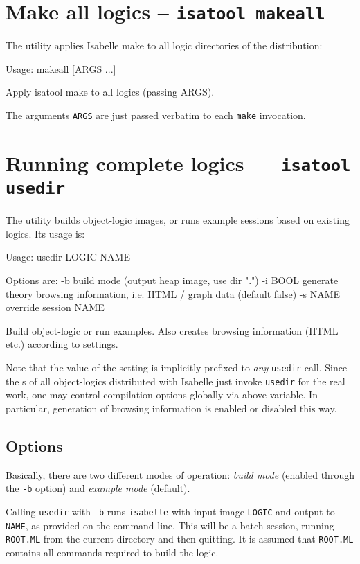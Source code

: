 \section{Make all logics -- \texttt{isatool makeall}}

The  utility applies Isabelle make to all logic
directories of the distribution:
\begin{ttbox}
Usage: makeall [ARGS ...]

  Apply isatool make to all logics (passing ARGS).
\end{ttbox}
The arguments \texttt{ARGS} are just passed verbatim to each
\texttt{make} invocation.


\section{Running complete logics --- \texttt{isatool usedir}} \label{sec:tool-usedir}

The  utility builds object-logic images, or runs
example sessions based on existing logics. Its usage is:
\begin{ttbox}
Usage: usedir LOGIC NAME

  Options are:
    -b           build mode (output heap image, use dir ".")
    -i BOOL      generate theory browsing information,
                 i.e. HTML / graph data (default false)
    -s NAME      override session NAME

  Build object-logic or run examples. Also creates browsing
  information (HTML etc.) according to settings.
\end{ttbox}

Note that the value of the  setting is
implicitly prefixed to \emph{any} \texttt{usedir} call. Since the
s of all object-logics distributed with Isabelle
just invoke \texttt{usedir} for the real work, one may control
compilation options globally via above variable. In particular,
generation of  browsing information is enabled or
disabled this way.


\subsection*{Options}

Basically, there are two different modes of operation: \emph{build
  mode} (enabled through the \texttt{-b} option) and \emph{example
  mode} (default).

Calling \texttt{usedir} with \texttt{-b} runs \texttt{isabelle} with
input image \texttt{LOGIC} and output to \texttt{NAME}, as provided on
the command line. This will be a batch session, running
\texttt{ROOT.ML} from the current directory and then quitting.  It is
assumed that \texttt{ROOT.ML} contains all {\ML} commands required to
build the logic.


